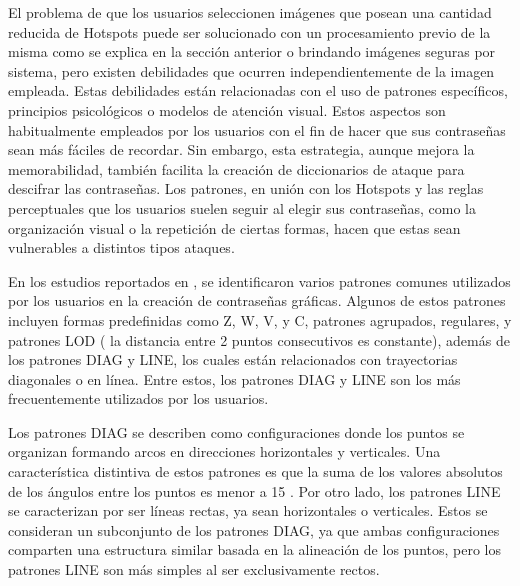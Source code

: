 \documentclass[12pt]{report}
\begin{document}
El problema de que los usuarios seleccionen imágenes que posean una cantidad reducida de Hotspots puede ser solucionado con un procesamiento previo de la misma como se explica en la sección anterior o brindando imágenes seguras por sistema, pero existen debilidades que ocurren independientemente de la imagen empleada. Estas debilidades están relacionadas con el uso de patrones específicos, principios psicológicos o modelos de atención visual. Estos aspectos son habitualmente empleados por los usuarios con el fin de hacer que sus contraseñas sean más fáciles de recordar. Sin embargo, esta estrategia, aunque mejora la memorabilidad, también facilita la creación de diccionarios de ataque para descifrar las contraseñas. Los patrones, en unión con los Hotspots y las reglas perceptuales que los usuarios suelen seguir al elegir sus contraseñas, como la organización visual o la repetición de ciertas formas, hacen que estas sean vulnerables a distintos tipos  ataques.



En los estudios reportados en \cite{5,20,21,22,23,24,25}, se identificaron varios patrones comunes utilizados por los usuarios en la creación de contraseñas gráficas. Algunos de estos patrones incluyen formas predefinidas como Z, W, V, y C, patrones agrupados, regulares, y patrones LOD ( la distancia entre 2 puntos consecutivos es constante), además de los patrones DIAG y LINE, los cuales están relacionados con trayectorias diagonales o en línea. Entre estos, los patrones DIAG y LINE son los más frecuentemente utilizados por los usuarios.

Los patrones DIAG se describen como configuraciones donde los puntos se organizan formando arcos en direcciones horizontales y verticales. Una característica distintiva de estos patrones es que la suma de los valores absolutos de los ángulos entre los puntos es menor a 15 \degree. Por otro lado, los patrones LINE se caracterizan por ser líneas rectas, ya sean horizontales o verticales. Estos se consideran un subconjunto de los patrones DIAG, ya que ambas configuraciones comparten una estructura similar basada en la alineación de los puntos, pero los patrones LINE son más simples al ser exclusivamente rectos.
\end{document}
